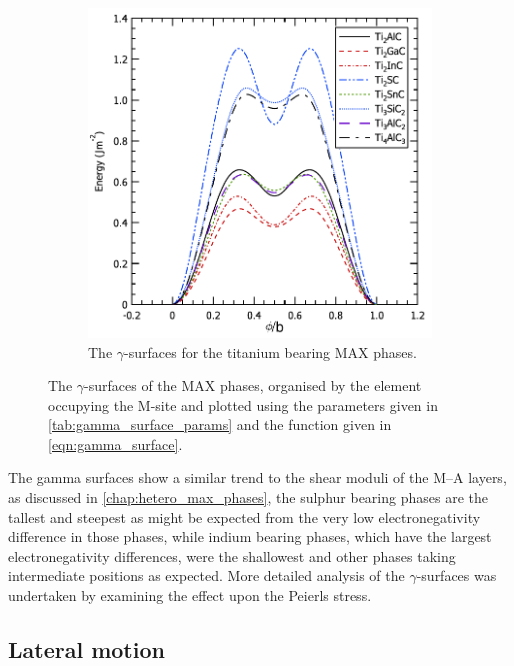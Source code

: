 \begin{figure}[!htb]
\begin{subfigure}{5cm}
\centering
\includegraphics[width=\textwidth]{Ti_gamma_surfaces}
\caption{The $\gamma$-surfaces for the titanium bearing MAX phases.\label{fig:Ti_gamma_surfaces}}
\end{subfigure}

\captionsetup{width=12cm}
\caption[The \texorpdfstring{$\gamma$}{gamma}-surfaces of the MAX phases.]{The $\gamma$-surfaces of the MAX phases, organised by the element occupying the M-site and plotted using the parameters given in \autoref{tab:gamma_surface_params} and the function given in \autoref{eqn:gamma_surface}. \label{fig:gamma_surfaces}}
\end{figure}


The gamma surfaces show a similar trend to the shear moduli of the M--A layers, as discussed in \autoref{chap:hetero_max_phases}, the sulphur bearing phases are the tallest and steepest as might be expected from the very low electronegativity difference in those phases, while indium bearing phases, which have the largest electronegativity differences, were the shallowest and other phases taking intermediate positions as expected. More detailed analysis of the $\gamma$-surfaces was undertaken by examining the effect upon the Peierls stress.


\subsection{Lateral motion}



